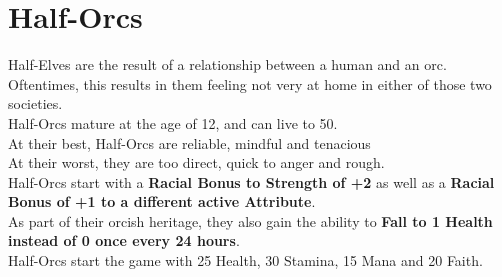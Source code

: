 \section{Half-Orcs}\label{species:half-orcs}
Half-Elves are the result of a relationship between a human and an orc.
Oftentimes, this results in them feeling not very at home in either of those two societies.\\
Half-Orcs mature at the age of 12, and can live to 50.\\
At their best, Half-Orcs are reliable, mindful and tenacious\\
At their worst, they are too direct, quick to anger and rough.\\
Half-Orcs start with a \textbf{Racial Bonus to Strength of +2} as well as a \textbf{Racial Bonus of +1 to a different active Attribute}.\\
As part of their orcish heritage, they also gain the ability to \textbf{Fall to 1 Health instead of 0 once every 24 hours}.\\
Half-Orcs start the game with 25 Health, 30 Stamina, 15 Mana and 20 Faith.